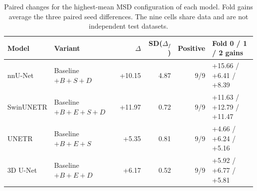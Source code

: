 \documentclass[12pt,a4paper]{article}
\begin{document}
\FloatBarrier
\begin{table}[htbp]
\centering\footnotesize{}
\setlength{\tabcolsep}{5pt}
\renewcommand{\arraystretch}{1.15}
\begin{tabular}{@{}llrrrl@{}}
\hline
Model & Variant & $\Delta$ & SD($\Delta_f$) & Positive & Fold 0 / 1 / 2 gains \\
\hline
nnU-Net & Baseline $+B+S+D$ & +10.15 & 4.87 & 9/9 & +15.66 / +6.41 / +8.39 \\
SwinUNETR & Baseline $+B+E+S+D$ & +11.97 & 0.72 & 9/9 & +11.63 / +12.79 / +11.47 \\
UNETR & Baseline $+B+E+S$ & +5.35 & 0.81 & 9/9 & +4.66 / +6.24 / +5.16 \\
3D U-Net & Baseline $+B+E+D$ & +6.17 & 0.52 & 9/9 & +5.92 / +6.77 / +5.81 \\
\hline
\end{tabular}
\caption{Paired changes for the highest-mean MSD configuration of each model. Fold gains average the three paired seed differences. The nine cells share data and are not independent test datasets.}
\label{tab:msd-noaug-best}
\end{table}
\FloatBarrier
\end{document}
